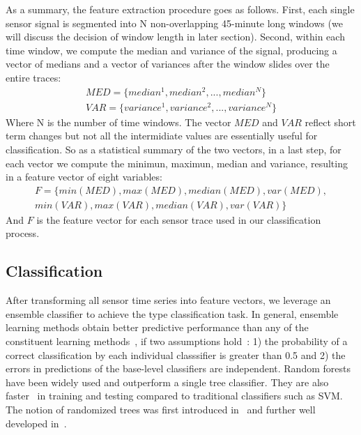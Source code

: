 As a summary, the feature extraction procedure goes as follows. First, each single sensor signal is segmented into N
non-overlapping 45-minute long windows (we will discuss the decision of window length in later section). Second, within
each time window, we compute the median and variance of the signal, producing a vector of medians and a vector of
variances after the window slides over the entire traces: 
\begin{displaymath}
\begin{split}
MED = \{median^{1}, median^{2}, ..., median^{N}\}\\
VAR = \{variance^{1}, variance^{2}, ..., variance^{N}\}
\end{split}
\end{displaymath}
Where N is the number of time windows. The vector $MED$ and $VAR$ reflect short term changes but not all the intermidiate values are essentially useful for classification. So as a statistical summary of the two vectors, in a last step, for each vector we compute the minimun, maximun, median and variance, resulting in a feature vector of eight variables:
\begin{displaymath}
\begin{split}
F = \{min(MED), max(MED), median(MED), var(MED),\\
 min(VAR), max(VAR), median(VAR), var(VAR)\}
\end{split}
\end{displaymath}
And $F$ is the feature vector for each sensor trace used in our classification process.

\subsection{Classification}
After transforming all sensor time series into feature vectors, we leverage an ensemble classifier to achieve 
the type classification task. In general, ensemble learning methods obtain better predictive performance than
 any of the constituent learning methods~\cite{ensem1,ensem2}, if two assumptions hold~\cite{ensem3}: 1) the 
 probability of a correct classification by each individual classsifier is greater than 0.5 and 2) the errors
  in predictions of the base-level classifiers are independent. Random forests~\cite{RF} have been widely used 
  and outperform a single tree classifier. They are also faster~\cite{cvpr} in training and testing compared to traditional classifiers such as SVM. The notion of randomized trees was first introduced in~\cite{RT} and further well developed in~\cite{RF}.

